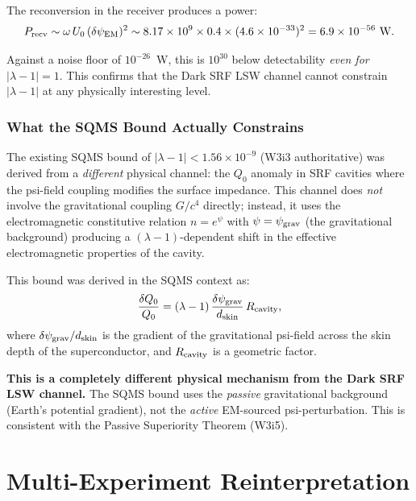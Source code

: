 \documentclass[11pt]{article}
\newcommand{\lam}{\lambda}
\newcommand{\lbone}{|\lambda - 1|}
\newcommand{\ee}[1]{\times 10^{#1}}
\newcommand{\psigrav}{\psi_{\rm grav}}
\newcommand{\dpsiEM}{\delta\psi_{\rm EM}}
\theoremstyle{definition}
\theoremstyle{remark}
\begin{document}
The reconversion in the receiver produces a power:
\begin{equation}
P_{\rm recv} \sim \omega\,U_0\,(\dpsiEM)^2 \sim 8.17\ee{9}\times 0.4
\times(4.6\ee{-33})^2 = 6.9\ee{-56}~\text{W}.
\label{eq:P_reconvert}
\end{equation}

Against a noise floor of $10^{-26}$~W, this is $10^{30}$ below
detectability \emph{even for $|\lam-1| = 1$}. This confirms that
the Dark SRF LSW channel cannot constrain $\lbone$ at any
physically interesting level.


\section{What the SQMS Bound Actually Constrains}
\label{sec:sqms_bound}

The existing SQMS bound of $\lbone < 1.56\ee{-9}$ (W3i3 authoritative)
was derived from a \emph{different} physical channel: the $Q_0$ anomaly
in SRF cavities where the psi-field coupling modifies the surface
impedance. This channel does \emph{not} involve the gravitational
coupling $G/c^4$ directly; instead, it uses the electromagnetic
constitutive relation $n = e^\psi$ with $\psi = \psigrav$ (the
gravitational background) producing a $(\lam-1)$-dependent shift
in the effective electromagnetic properties of the cavity.

This bound was derived in the SQMS context as:
\begin{equation}
\frac{\delta Q_0}{Q_0} = (\lam-1)\,\frac{\delta\psi_{\rm grav}}{d_{\rm skin}}
\,R_{\rm cavity},
\label{eq:sqms_mechanism}
\end{equation}
where $\delta\psi_{\rm grav}/d_{\rm skin}$ is the gradient of the
gravitational psi-field across the skin depth of the superconductor,
and $R_{\rm cavity}$ is a geometric factor.

\textbf{This is a completely different physical mechanism from the
Dark SRF LSW channel.} The SQMS bound uses the \emph{passive}
gravitational background (Earth's potential gradient), not the
\emph{active} EM-sourced psi-perturbation. This is consistent with
the Passive Superiority Theorem (W3i5).


\part{Multi-Experiment Reinterpretation}
\label{part:multi}
\end{document}
